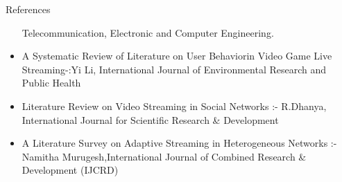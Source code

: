 \documentclass{beamer}
\begin{document}
\begin{frame}[t]{References}
\begin{center}
\begin{itemize}
Telecommunication, Electronic and Computer Engineering.
           
            \item A Systematic Review of Literature on User Behaviorin Video Game Live Streaming-:Yi Li, International Journal of Environmental Research and Public Health
            
           
            \item Literature Review on Video Streaming in Social Networks :- R.Dhanya,  International Journal for Scientific Research & Development
           
            \item A Literature Survey on Adaptive Streaming in Heterogeneous Networks :- Namitha Murugesh,International Journal of Combined Research & Development (IJCRD)
        \end{itemize}
    \end{center}
\end{frame}
\end{document}
